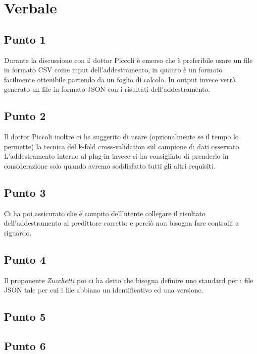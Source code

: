 \section{Verbale}
        \subsection{Punto 1}
            Durante la discussione con il dottor Piccoli è emerso che è preferibile usare un file in formato CSV come input dell'addestramento, in quanto è un formato facilmente ottenibile partendo da un foglio di calcolo. In output invece verrà generato un file in formato JSON con i risultati dell'addestramento.
        \subsection{Punto 2}
            Il dottor Piccoli inoltre ci ha suggerito di usare (opzionalmente se il tempo lo permette) la tecnica del k-fold cross-validation sul campione di dati osservato. L'addestramento interno al plug-in invece ci ha consigliato di prenderlo in considerazione solo quando avremo soddisfatto tutti gli altri requisiti.
        \subsection{Punto 3}
            Ci ha poi assicurato che è compito dell'utente collegare il risultato dell'addestramento al predittore corretto e perciò non bisogna fare controlli a riguardo.
        \subsection{Punto 4}
            Il proponente \textit{Zucchetti} poi ci ha detto che bisogna definire uno standard per i file JSON tale per cui i file abbiano un identificativo ed una versione.
        \subsection{Punto 5}
            
        \subsection{Punto 6}
            